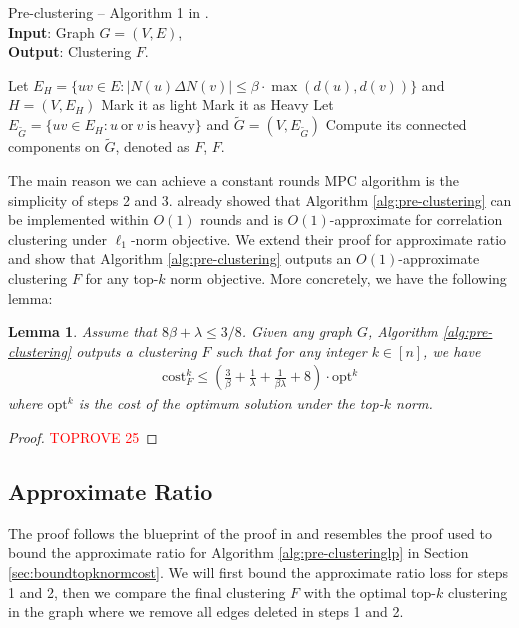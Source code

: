 \documentclass[11pt]{article}
\newcommand{\cost}{\mathrm{cost}}
\newtheorem{lemma}[theorem]{Lemma}
\newcommand{\opt}{{\mathrm{opt}}}
\begin{document}
\begin{CJK*}{UTF8}{gbsn}
\begin{algorithm}[ht!]
\caption{Pre-clustering – Algorithm 1 in \cite{cohen2021correlation}. \\
\textbf{Input}: Graph $G = (V, E)$, \\
\textbf{Output}: Clustering $F$.}
\label{alg:pre-clustering}
\begin{algorithmic}[1]
 \State Let $E_H = \{uv \in E: |N(u) \Delta N(v)| \leq \beta \cdot \max(d(u), d(v))\}$ and $H = (V, E_H)$
 \label{alg:pre-clusteringfirst}
 \label{alg:pre-clusteringsecondstart}
 Mark it as light
\Else \quad Mark it as Heavy
\EndIf
\EndFor  
\State Let $E_{\tilde{G}} = \{ uv \in E_H: u \mathrm{\ or\ } v \mathrm{\ is\ heavy} \}$ and $\tilde{G} = (V, E_{\tilde{G}})$ \label{alg:pre-clusteringsecondend}
\State Compute its connected components on $\tilde{G}$, denoted as $F$,
\Return $F$.
\EndFunction
    \end{algorithmic}    
\end{algorithm}

The main reason we can achieve a constant rounds MPC algorithm is the simplicity of steps 2 and 3. \cite{cohen2021correlation} already showed that Algorithm \ref{alg:pre-clustering} can be implemented within $O(1)$ rounds and is $O(1)$-approximate for correlation clustering under $\ell_1$-norm objective. We extend their proof for approximate ratio and show that Algorithm \ref{alg:pre-clustering} outputs an $O(1)$-approximate clustering $F$ for any top-$k$ norm objective. More concretely, we have the following lemma:

\begin{lemma}
\label{lemma:preclusteringratio}
Assume that $8\beta + \lambda \leq 3/8$. Given any graph $G$, Algorithm \ref{alg:pre-clustering} outputs a clustering $F$ such that for any integer $k \in [n]$, we have 
\begin{align*}
    \cost^k_{F} \leq \left(\frac{3}{\beta} + \frac{1}{\lambda} + \frac{1}{\beta\lambda} + 8\right) \cdot \opt^k
\end{align*}
where $\opt^k$ is the cost of the optimum solution under the top-$k$ norm.
\end{lemma}

\begin{proof}\textcolor{red}{TOPROVE 25}\end{proof}


\subsection{Approximate Ratio}
The proof follows the blueprint of the proof in \cite{cohen2021correlation} and resembles the proof used to bound the approximate ratio for Algorithm \ref{alg:pre-clusteringlp} in Section \ref{sec:boundtopknormcost}. We will first bound the approximate ratio loss for steps 1 and 2, then we compare the final clustering $F$ with the optimal top-$k$ clustering in the graph where we remove all edges deleted in steps 1 and 2.




\end{CJK*}
\end{document}
